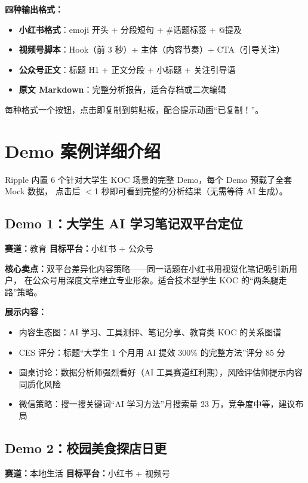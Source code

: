 \documentclass[12pt,a4paper]{ctexart}
\begin{document}
\textbf{四种输出格式：}
\begin{itemize}
  \item \textbf{小红书格式}：emoji 开头 + 分段短句 + \#话题标签 + @提及
  \item \textbf{视频号脚本}：Hook（前 3 秒）+ 主体（内容节奏）+ CTA（引导关注）
  \item \textbf{公众号正文}：标题 H1 + 正文分段 + 小标题 + 关注引导语
  \item \textbf{原文 Markdown}：完整分析报告，适合存档或二次编辑
\end{itemize}

每种格式一个按钮，点击即复制到剪贴板，配合提示动画``已复制！''。


\section{Demo 案例详细介绍}

Ripple 内置 6 个针对大学生 KOC 场景的完整 Demo，每个 Demo 预载了全套 Mock 数据，
点击后 $<$1 秒即可看到完整的分析结果（无需等待 AI 生成）。

\subsection{Demo 1：大学生 AI 学习笔记双平台定位}

\textbf{赛道：}教育 \quad \textbf{目标平台：}小红书 + 公众号

\textbf{核心卖点：}双平台差异化内容策略——同一话题在小红书用视觉化笔记吸引新用户，
在公众号用深度文章建立专业形象。适合技术型学生 KOC 的``两条腿走路''策略。

\textbf{展示内容：}
\begin{itemize}
  \item 内容生态图：AI 学习、工具测评、笔记分享、教育类 KOC 的关系图谱
  \item CES 评分：标题``大学生 1 个月用 AI 提效 300\% 的完整方法''评分 85 分
  \item 圆桌讨论：数据分析师强烈看好（AI 工具赛道红利期），风险评估师提示内容同质化风险
  \item 微信策略：搜一搜关键词``AI 学习方法''月搜索量 23 万，竞争度中等，建议布局
\end{itemize}

\subsection{Demo 2：校园美食探店日更}

\textbf{赛道：}本地生活 \quad \textbf{目标平台：}小红书 + 视频号
\end{document}
